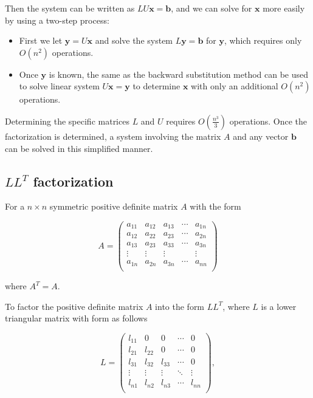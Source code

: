 \documentclass[preprint,12pt]{elsarticle}
\begin{document}
Then the system can be written as $LU\mathbf{x}=\mathbf{b}$,  and we can solve for $\mathbf{x}$ more easily by using a two-step process:

\begin{itemize}
\item First we let $\mathbf{y} = U\mathbf{x} $ and solve the system $L\mathbf{y} = \mathbf{b}$ for $\mathbf{y}$, which requires only $O(n^2)$ operations.
\item Once $\mathbf{y}$ is known, the same as the backward substitution method can be used to solve linear system $U\mathbf{x} = \mathbf{y} $ to determine $\mathbf{x}$ with only an additional $O(n^2)$ operations.
\end{itemize}

Determining the specific matrices $L$ and $U$ requires $O(\frac{n^3}{3})$ operations. Once the factorization is determined, a system involving the matrix $A$ and any vector $\mathbf{b}$ can be solved in this simplified manner.

\subsection{$LL^T$ factorization}
\label{SS:2.2}

For a $n \times n$ symmetric positive definite matrix $A$ with the form

\[
A=\left(
    \begin{array}{ccccc}
      a_{11} & a_{12} & a_{13} & \cdots & a_{1n} \\
      a_{12} & a_{22} & a_{23} & \cdots & a_{2n} \\
      a_{13} & a_{23} & a_{33} & \cdots & a_{3n} \\
      \vdots & \vdots & \vdots &  & \vdots \\
      a_{1n} & a_{2n} & a_{3n} & \cdots & a_{nn} \\
    \end{array}
  \right)
\]

where $A^T=A$.

To factor the  positive definite matrix $A$ into the form $LL^T$, where $L$ is a lower triangular matrix with form as follows

\[
L=\left(%
\begin{array}{ccccc}
  l_{11} & 0 & 0& \cdots & 0 \\
  l_{21} & l_{22} & 0 & \cdots& 0 \\
  l_{31} & l_{32} & l_{33} & \cdots & 0 \\
  \vdots & \vdots & \vdots &\ddots & \vdots \\
  l_{n1} & l_{n2} & l_{n3} & \cdots & l_{nn} \\
\end{array}%
\right) ,
\]
\end{document}

